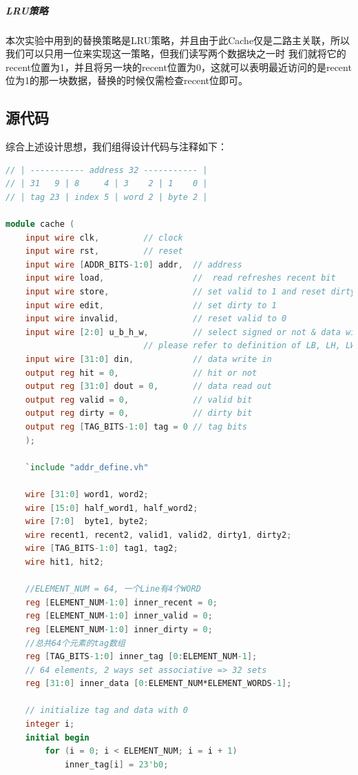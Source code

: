 \subparagraph{LRU策略} 本次实验中用到的替换策略是LRU策略，并且由于此Cache仅是二路主关联，所以我们可以只用一位来实现这一策略，但我们读写两个数据块之一时
我们就将它的recent位置为1，并且将另一块的recent位置为0，这就可以表明最近访问的是recent位为1的那一块数据，替换的时候仅需检查recent位即可。

\subsection{源代码}
综合上述设计思想，我们组得设计代码与注释如下：

\begin{lstlisting}[language = {verilog}]
// | ----------- address 32 ----------- |
// | 31   9 | 8     4 | 3    2 | 1    0 |
// | tag 23 | index 5 | word 2 | byte 2 |

module cache (
    input wire clk,         // clock
    input wire rst,         // reset
    input wire [ADDR_BITS-1:0] addr,  // address
    input wire load,                  //  read refreshes recent bit
    input wire store,                 // set valid to 1 and reset dirty to 0
    input wire edit,                  // set dirty to 1
    input wire invalid,               // reset valid to 0
    input wire [2:0] u_b_h_w,         // select signed or not & data width
                            // please refer to definition of LB, LH, LW, LBU, LHU in RV32I Instruction Set  
    input wire [31:0] din,            // data write in
    output reg hit = 0,               // hit or not
    output reg [31:0] dout = 0,       // data read out
    output reg valid = 0,             // valid bit
    output reg dirty = 0,             // dirty bit
    output reg [TAG_BITS-1:0] tag = 0 // tag bits
    );

    `include "addr_define.vh"

    wire [31:0] word1, word2;
    wire [15:0] half_word1, half_word2;
    wire [7:0]  byte1, byte2;
    wire recent1, recent2, valid1, valid2, dirty1, dirty2;
    wire [TAG_BITS-1:0] tag1, tag2;
    wire hit1, hit2;

    //ELEMENT_NUM = 64, 一个Line有4个WORD
    reg [ELEMENT_NUM-1:0] inner_recent = 0;
    reg [ELEMENT_NUM-1:0] inner_valid = 0;
    reg [ELEMENT_NUM-1:0] inner_dirty = 0;
    //总共64个元素的tag数组
    reg [TAG_BITS-1:0] inner_tag [0:ELEMENT_NUM-1];
    // 64 elements, 2 ways set associative => 32 sets
    reg [31:0] inner_data [0:ELEMENT_NUM*ELEMENT_WORDS-1];

    // initialize tag and data with 0
    integer i;
    initial begin
        for (i = 0; i < ELEMENT_NUM; i = i + 1)
            inner_tag[i] = 23'b0;


\end{lstlisting}
